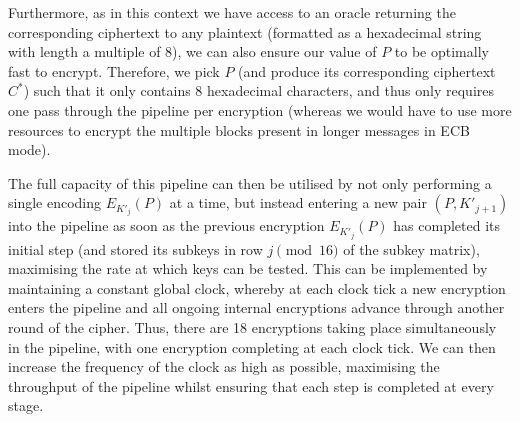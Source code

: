 \documentclass[a4paper, 11pt]{article}
\begin{document}
Furthermore, as in this context we have access to an oracle returning the corresponding ciphertext to any plaintext (formatted as a hexadecimal string with length a multiple of 8), we can also ensure our value of $P$ to be optimally fast to encrypt. Therefore, we pick $P$ (and produce its corresponding ciphertext $C^{*}$) such that it only contains 8 hexadecimal characters, and thus only requires one pass through the pipeline per encryption (whereas we would have to use more resources to encrypt the multiple blocks present in longer messages in ECB mode).

The full capacity of this pipeline can then be utilised by not only performing a single encoding $E_{K'_{j}}(P)$ at a time, but instead entering a new pair $(P, K'_{j+1})$ into the pipeline as soon as the previous encryption $E_{K'_{j}}(P)$ has completed its initial step (and stored its subkeys in row $j \pmod{16}$ of the subkey matrix), maximising the rate at which keys can be tested. This can be implemented by maintaining a constant global clock, whereby at each clock tick a new encryption enters the pipeline and all ongoing internal encryptions advance through another round of the cipher. Thus, there are 18 encryptions taking place simultaneously in the pipeline, with one encryption completing at each clock tick. We can then increase the frequency of the clock as high as possible, maximising the throughput of the pipeline whilst ensuring that each step is completed at every stage.
\end{document}
